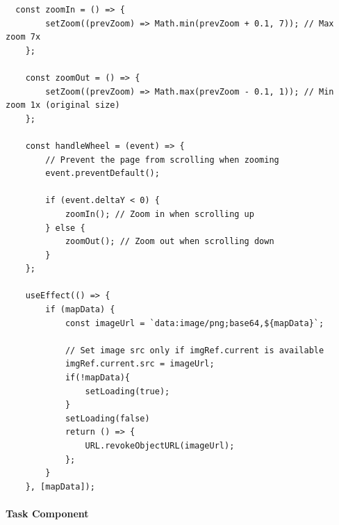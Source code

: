 \documentclass[../../main]{subfiles}
\begin{document}
\begin{codebox}[]{}
  
  \begin{verbatim}
  const zoomIn = () => {
        setZoom((prevZoom) => Math.min(prevZoom + 0.1, 7)); // Max zoom 7x
    };

    const zoomOut = () => {
        setZoom((prevZoom) => Math.max(prevZoom - 0.1, 1)); // Min zoom 1x (original size)
    };

    const handleWheel = (event) => {
        // Prevent the page from scrolling when zooming
        event.preventDefault();
        
        if (event.deltaY < 0) {
            zoomIn(); // Zoom in when scrolling up
        } else {
            zoomOut(); // Zoom out when scrolling down
        }
    };

    useEffect(() => {
        if (mapData) {
            const imageUrl = `data:image/png;base64,${mapData}`;

            // Set image src only if imgRef.current is available
            imgRef.current.src = imageUrl;
            if(!mapData){
                setLoading(true);
            }
            setLoading(false)
            return () => {
                URL.revokeObjectURL(imageUrl);
            };
        }
    }, [mapData]);

\end{verbatim}
\end{codebox}



\paragraph{Task Component}
\end{document}
